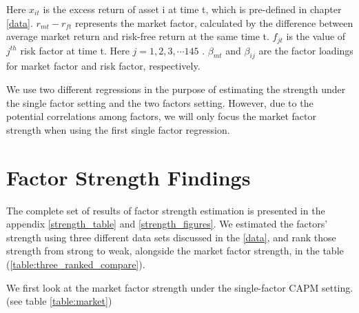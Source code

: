 Here $x_{it}$ is the excess return of asset i at time t, which is pre-defined in chapter \ref{data}.
$r_{mt} - r_{ft}$ represents the market factor, calculated by the difference between average market return and risk-free return at the same time t.
$f_{jt}$ is the value of $j^{th}$ risk factor  at time t. 
Here $j = 1, 2, 3,\cdots 145$ . 
$\beta_{mt}$ and $\beta_{ij}$ are the factor loadings for market factor and risk factor, respectively.

We use two different regressions in the purpose of estimating the strength under the single factor setting and the two factors setting.
However, due to the potential correlations among factors, we will only focus the market factor strength when using the first single factor regression.


	\section{Factor Strength Findings}
The complete set of results of factor strength estimation is presented in the appendix \ref{strength_table} and \ref{strength_figures}.
We estimated the factors' strength using three different data sets discussed in the \ref{data}, and rank those strength from strong to weak, alongside the market factor strength, in the table (\ref{table:three_ranked_compare}).

We first look at the market factor strength under the single-factor CAPM setting. (see table \ref{table:market})

